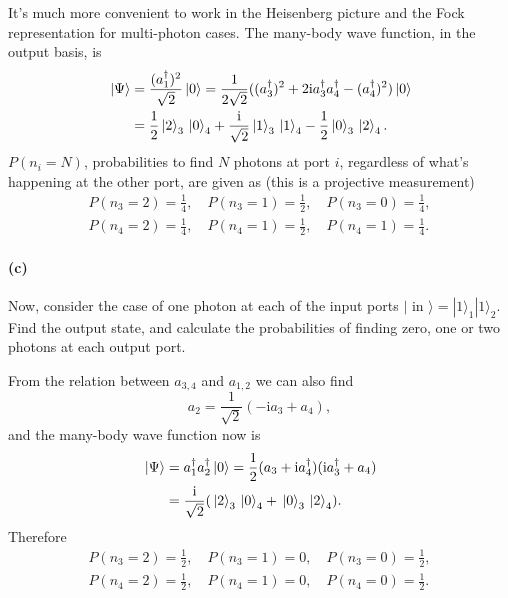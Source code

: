 \documentclass[hyperref, a4paper]{article}
\newcommand*{\ii}{\mathrm{i}}
\begin{document}
It's much more convenient to work in the Heisenberg picture and the Fock representation 
for multi-photon cases.
The many-body wave function, in the output basis, is 
\begin{equation}
    \begin{aligned}
        \ket*{\Psi} &= \frac{(a_1^\dag)^2}{\sqrt{2}} \ket*{0} 
        = \frac{1}{2 \sqrt{2}} ((a_3^\dag)^2 + 2 \ii a_3^\dag a_4^\dag - (a_4^\dag)^2 ) \ket*{0} \\
        &= \frac{1}{2} \ket*{2}_3 \ket*{0}_4 + \frac{\ii}{\sqrt{2}} \ket*{1}_3 \ket*{1}_4 - \frac{1}{2} \ket*{0}_3 \ket*{2}_4.
    \end{aligned}
\end{equation} 
$P(n_i = N)$, probabilities to find $N$ photons at port $i$, 
regardless of what's happening at the other port, are given as (this is a projective measurement)
\begin{equation}
    \begin{aligned}
        P(n_3=2) = \frac{1}{4}, \quad P(n_3=1) = \frac{1}{2}, \quad P(n_3=0) = \frac{1}{4}, \\ 
        P(n_4=2) = \frac{1}{4}, \quad P(n_4=1) = \frac{1}{2}, \quad P(n_4=1) = \frac{1}{4}.
    \end{aligned}
\end{equation}

\paragraph*{(c)} Now, consider the case of one photon at each of the input ports $\mid$ in $\rangle=|1\rangle_1|1\rangle_2$. Find the output state, and calculate the probabilities of finding zero, one or two photons at each output port.

From the relation between $a_{3,4}$ and $a_{1,2}$ we can also find 
\begin{equation}
    a_2 = \frac{1}{\sqrt{2}} (- \ii a_3 + a_4) ,
\end{equation}
and the many-body wave function now is 
\begin{equation}
    \begin{aligned}
        \ket*{\Psi} &= a_1^\dag a_2^\dag \ket*{0}
        = \frac{1}{2} (a_3 + \ii a_4^\dag) (\ii a_3^\dag + a_4) \\
        &= \frac{\ii}{\sqrt{2}} (\ket*{2}_3 \ket*{0}_4 + \ket*{0}_3 \ket*{2}_4).
    \end{aligned}
\end{equation}
Therefore
\begin{equation}
    \begin{aligned}
        P(n_3=2) = \frac{1}{2}, \quad P(n_3=1) = 0, \quad P(n_3=0) = \frac{1}{2}, \\
        P(n_4=2) = \frac{1}{2}, \quad P(n_4=1) = 0, \quad P(n_4=0) = \frac{1}{2}. \\
    \end{aligned}
\end{equation}
\end{document}
